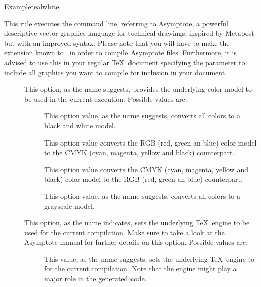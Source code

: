 \begin{description}
\begin{codebox}{Example}{teal}{\icnote}{white}
\end{codebox}

\item[\rulebox{asymptote}]
This rule executes the  command line, referring to Asymptote, a powerful descriptive vector graphics language for technical drawings, inspired by Metapost but with an improved syntax. Please note that you will have to make the  extension known to \arara\ in order to compile Asymptote files. Furthermore, it is advised to use this in your regular \TeX\ document specifying the  parameter to include all graphics you want to compile for inclusion in your document.

\begin{description}
\item[] This option, as the name suggests, provides the underlying color model to be used in the current execution. Possible values are:

\begin{description}
\item[] This option value, as the name suggests, converts all colors to a black and white model.

\item[] This option value converts the RGB (red, green an blue) color model to the CMYK (cyan, magenta, yellow and black) counterpart. 

\item[] This option value converts the CMYK (cyan, magenta, yellow and black)  color model to the RGB (red, green an blue) counterpart.

\item[] This option value, as the name suggests, converts all colors to a grayscale model.
\end{description}

\item[] This option, as the name indicates, sets the underlying \TeX\ engine to be used for the current compilation. Make sure to take a look at the Asymptote manual for further details on this option. Possible values are:

\begin{description}
\item[] This value, as the name suggests, sets the underlying \TeX\ engine to  for the current compilation. Note that the engine might play a major role in the generated code.


\end{description}
\end{description}
\end{description}

